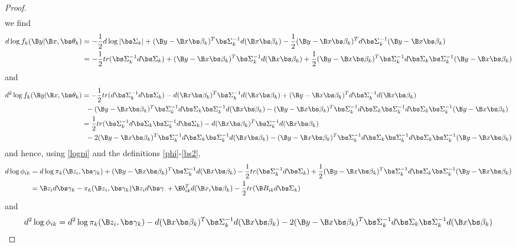 \begin{proof}
\begin{align*}
\end{align*}
we find 
\begin{align*}
d\log f_{k}(\B y|\B x,\bs\theta_{k})&=-\frac{1}{2}d\log|\bs\Sigma_{k}|+(\B y-\B x\bs \beta_{k})^{T}\bs\Sigma_{k}^{-1}d(\B x\bs \beta_{k})-\frac{1}{2}(\B y-\B x\bs \beta_{k})^{T}d\bs\Sigma_{k}^{-1}(\B y-\B x\bs\beta_{k})\\
&=-\frac{1}{2}tr(\bs\Sigma_{k}^{-1}d\bs\Sigma_{k})+(\B y-\B x\bs \beta_{k})^{T}\bs\Sigma_{k}^{-1}d(\B x\bs \beta_{k})+\frac{1}{2}(\B y-\B x\bs \beta_{k})^{T}\bs\Sigma_{k}^{-1}d\bs\Sigma_{k}\bs\Sigma_{k}^{-1}(\B y-\B x\bs\beta_{k})\\
\end{align*}
and
\begin{align*}
d^{2}\log f_{k}(\B y|\B x,\bs\theta_{k})&=-\frac{1}{2}tr(d\bs\Sigma_{k}^{-1}d\bs\Sigma_{k})-d(\B x\bs \beta_{k})^{T}\bs\Sigma_{k}^{-1}d(\B x\bs \beta_{k})+(\B y-\B x\bs \beta_{k})^{T}d\bs\Sigma_{k}^{-1}d(\B x\bs \beta_{k})\\
&\;\;-(\B y-\B x\bs \beta_{k})^{T}\bs\Sigma_{k}^{-1}d\bs\Sigma_{k}\bs\Sigma_{k}^{-1}d(\B x\bs\beta_{k})-(\B y-\B x\bs \beta_{k})^{T}\bs\Sigma_{k}^{-1}d\bs\Sigma_{k}\bs\Sigma_{k}^{-1}d\bs\Sigma_{k}\bs\Sigma_{k}^{-1}(\B y-\B x\bs\beta_{k})\\
&=\frac{1}{2}tr(\bs\Sigma_{k}^{-1}d\bs\Sigma_{k}\bs\Sigma_{k}^{-1}d\bs\Sigma_{k})-d(\B x\bs \beta_{k})^{T}\bs\Sigma_{k}^{-1}d(\B x\bs \beta_{k})\\
&\;\;-2(\B y-\B x\bs \beta_{k})^{T}\bs\Sigma_{k}^{-1}d\bs\Sigma_{k}\bs\Sigma_{k}^{-1}d(\B x\bs\beta_{k})-(\B y-\B x\bs \beta_{k})^{T}\bs\Sigma_{k}^{-1}d\bs\Sigma_{k}\bs\Sigma_{k}^{-1}d\bs\Sigma_{k}\bs\Sigma_{k}^{-1}(\B y-\B x\bs\beta_{k})\\
\end{align*}
and hence, using \eqref{logpi} and the definitions \eqref{phi}-\eqref{bs2},
\begin{align}
d\log \phi_{ik}&=d\log \pi_{k}(\B z_{i},\bs\gamma_k)+(\B y-\B x\bs \beta_{k})^{T}\bs\Sigma_{k}^{-1}d(\B x\bs \beta_{k})-\frac{1}{2}tr(\bs\Sigma_{k}^{-1}d\bs\Sigma_{k})+\frac{1}{2}(\B y-\B x\bs \beta_{k})^{T}\bs\Sigma_{k}^{-1}d\bs\Sigma_{k}\bs\Sigma_{k}^{-1}(\B y-\B x\bs\beta_{k})\nonumber\\
&=\B z_{i} d\bs \gamma_{k} -\pi_{k}(\B z_{i},\bs\gamma_k)\B z_{i}d\bs\gamma_{\cdot}+\B b^{T}_{ik}d(\B x_{i}\bs \beta_{k})-\frac{1}{2}tr(\B B_{ik}d\bs\Sigma_{k})\nonumber
\end{align}
and
\begin{align}
d^{2}\log \phi_{ik}&=d^{2}\log \pi_{k}(\B z_{i},\bs\gamma_k)-d(\B x\bs \beta_{k})^{T}\bs\Sigma_{k}^{-1}d(\B x\bs \beta_{k})-2(\B y-\B x\bs \beta_{k})^{T}\bs\Sigma_{k}^{-1}d\bs\Sigma_{k}\bs\Sigma_{k}^{-1}d(\B x\bs\beta_{k})\nonumber\\

\end{align}
\end{proof}
